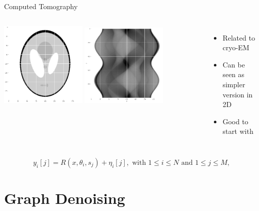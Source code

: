 \documentclass[aspectratio=169]{beamer}
\begin{document}
\begin{frame}[c]{Computed Tomography}
    \begin{columns}[c]
                \includegraphics[width=0.4\textwidth]{phantom.png}
                \includegraphics[width=0.4\textwidth]{phantom_sinogram.png}
                
            \begin{itemize}
                \item Related to cryo-EM
                \item Can be seen as simpler version in 2D
                \item Good to start with
            \end{itemize}
    \end{columns}

    \begin{definition}[Observation]
        $$ y_i[j] = R(x, \theta_i, s_j) + \eta_i[j] , \text{ with } 1 \leq i \leq N \text{ and } 1 \leq j \leq M,$$
    \end{definition}

\end{frame}


\section{Graph Denoising}
\end{document}
